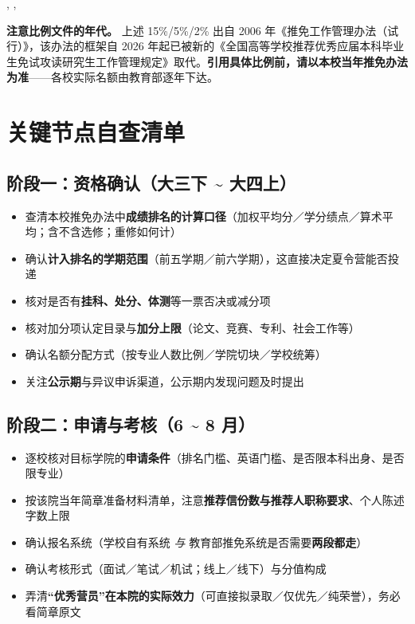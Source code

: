 , , 

\begin{keybox}
\textbf{注意比例文件的年代。} 上述 15\%/5\%/2\% 出自 2006 年《推免工作管理办法（试行）》，该办法的框架自 2026 年起已被新的《全国高等学校推荐优秀应届本科毕业生免试攻读研究生工作管理规定》取代。\textbf{引用具体比例前，请以本校当年推免办法为准}——各校实际名额由教育部逐年下达。
\end{keybox}

\section{关键节点自查清单}

\subsection*{阶段一：资格确认（大三下 \textasciitilde{} 大四上）}

\begin{itemize}
\item[$\square$] 查清本校推免办法中\textbf{成绩排名的计算口径}（加权平均分／学分绩点／算术平均；含不含选修；重修如何计）
\item[$\square$] 确认\textbf{计入排名的学期范围}（前五学期／前六学期），这直接决定夏令营能否投递
\item[$\square$] 核对是否有\textbf{挂科、处分、体测}等一票否决或减分项
\item[$\square$] 核对加分项认定目录与\textbf{加分上限}（论文、竞赛、专利、社会工作等）
\item[$\square$] 确认名额分配方式（按专业人数比例／学院切块／学校统筹）
\item[$\square$] 关注\textbf{公示期}与异议申诉渠道，公示期内发现问题及时提出
\end{itemize}

\subsection*{阶段二：申请与考核（6 \textasciitilde{} 8 月）}

\begin{itemize}
\item[$\square$] 逐校核对目标学院的\textbf{申请条件}（排名门槛、英语门槛、是否限本科出身、是否限专业）
\item[$\square$] 按该院当年简章准备材料清单，注意\textbf{推荐信份数与推荐人职称要求}、个人陈述字数上限
\item[$\square$] 确认报名系统（学校自有系统 \emph{与} 教育部推免系统是否需要\textbf{两段都走}）
\item[$\square$] 确认考核形式（面试／笔试／机试；线上／线下）与分值构成
\item[$\square$] 弄清\textbf{“优秀营员”在本院的实际效力}（可直接拟录取／仅优先／纯荣誉），务必看简章原文
\end{itemize}

